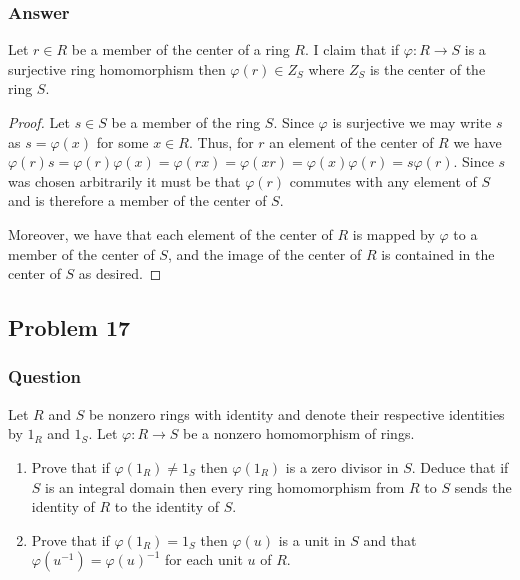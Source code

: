 \documentclass[12pt]{article}
\begin{document}
\subsubsection{Answer}
Let $r \in R $  be a member of the center of a ring $R$. I claim that if $\varphi: R \to S$ is a surjective ring homomorphism then $\varphi(r) \in Z_S$ where $Z_S$ is the center of the ring $S$. 

\begin{proof}
Let $s \in S $ be a member of the ring $S$. Since $\varphi$ is surjective we may write $s$ as $s = \varphi(x)$ for some $x \in R$. Thus, for $r$ an element of the center of $R$ we have $\varphi(r) s = \varphi(r) \varphi(x) = \varphi(r x) =  \varphi(x r) = \varphi(x) \varphi(r) = s \varphi(r)$. Since $s$ was chosen arbitrarily it must be that $\varphi(r)$ commutes with any element of $S$ and is therefore a member of the center of $S$. 

Moreover, we have that each element of the center of $R$ is mapped by $\varphi$ to a member of the center of $S$, and the image of the center of $R$ is contained in the center of $S$ as desired.\end{proof}
\subsection{Problem 17}

\subsubsection{Question}
Let $R$ and $S$ be nonzero rings with identity and denote their respective identities by $1_R$ and $1_S$. Let $\varphi : R \to S $ be a nonzero homomorphism of rings.
\begin{enumerate}
\item Prove that if $\varphi(1_R) \neq 1_S$ then $\varphi(1_R)$ is a zero divisor in $S$. Deduce that if $S$ is an integral domain then every ring homomorphism from $R$ to $S$ sends the identity of $R$ to the identity of $S$.
\item Prove that if $\varphi(1_R) = 1_S$ then $\varphi(u)$ is a unit in $S$ and that $\varphi (u^{-1})=\varphi(u)^{-1}$ for each unit $u$ of $R$.
\end{enumerate}
\end{document}
